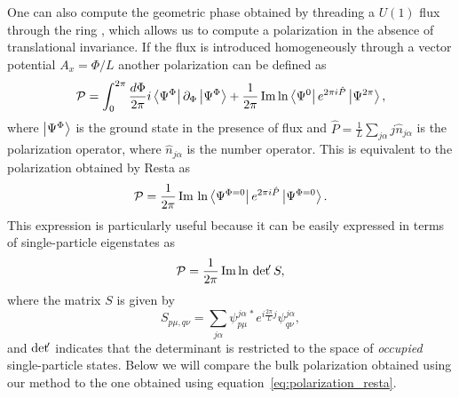 \documentclass[twocolumn,amsmath,longbibliography,amssymb,superscriptaddress]{revtex4-1}
\begin{document}
One can also compute the geometric phase obtained by threading a $U(1)$ flux through the ring \cite{Watanabe2018}, which allows us to compute a polarization in the absence of translational invariance. If the flux is introduced homogeneously through a vector potential $A_x = \Phi/L$ another polarization can be defined as
\begin{equation}
\mathcal{P} = \int_0^{2\pi}\frac{d\Phi}{2\pi} i\bra{\Psi^\Phi}\partial_\Phi \ket{\Psi^\Phi} + \frac{1}{2\pi}\Im\ln \bra{\Psi^0}e^{2\pi i \hat{P}} \ket{\Psi^{2\pi}}, 
\end{equation}
where $\ket{\Psi^{\Phi}}$ is the ground state in the presence of flux and $\hat{P}=\frac{1}{L}\sum_{j\alpha} j\hat{n}_{j\alpha}$ is the polarization operator, where $\hat{n}_{j\alpha}$ is the number operator. This is equivalent to the polarization obtained by Resta \cite{Resta1997} as
\begin{align}
\mathcal{P} = \frac{1}{2\pi} \Im \,\ln\bra{\Psi^{\Phi=0}}e^{2\pi i \hat{P}}\ket{\Psi^{\Phi=0}}.
\end{align}
This expression is particularly useful because it can be easily expressed in terms of single-particle eigenstates as
\begin{align}
\mathcal{P} = \frac{1}{2\pi}\Im \ln \, {\rm det }\!' \, S,
\label{eq:polarization_resta}
\end{align}
where the matrix $S$ is given by
\begin{equation}
S_{p\mu,q\nu} = \sum_{j\alpha} \psi_{p\mu}^{j \alpha \, \ast} e^{i\frac{2\pi}{L}j}\psi_{q\nu}^{j \alpha},
\end{equation}
and  ${\rm det }\!' $ indicates that the determinant is restricted to the space of \emph{occupied} single-particle states. Below we will compare the bulk polarization obtained using our method to the one obtained using equation~\eqref{eq:polarization_resta}.
\end{document}
